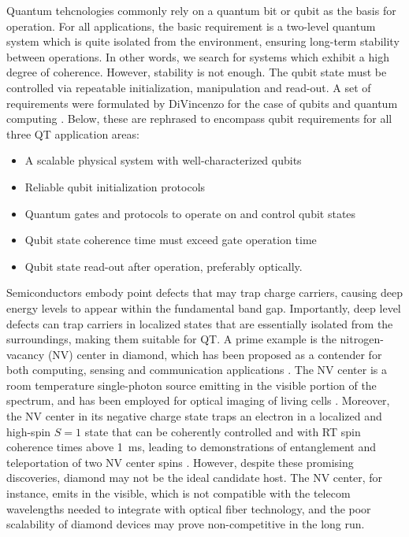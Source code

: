 \documentclass[superscriptaddress,unsortedaddress,
 amsmath,amssymb,
 aps,
]{revtex4-2}
\begin{document}
Quantum tehcnologies commonly rely on a quantum bit or qubit as the basis for operation. 
For all applications, the basic requirement is a two-level quantum system which is quite isolated from the environment, ensuring long-term stability between operations. In other words, we search for systems which exhibit a high degree of coherence. 
However, stability is not enough. The qubit state must be controlled via repeatable initialization, manipulation and read-out. 
A set of requirements were formulated by DiVincenzo for the case of qubits and quantum computing \cite{DiVincenzo2000}. Below, these are rephrased to encompass qubit requirements for all three QT application areas:  
\begin{itemize}
    \item A scalable physical system with well-characterized qubits
    \item Reliable qubit initialization protocols 
    \item Quantum gates and protocols to operate on and control qubit states  
    \item Qubit state coherence time must exceed gate operation time 
    \item Qubit state read-out after operation, preferably optically.  
\end{itemize}

Semiconductors embody point defects that may trap charge carriers, causing deep energy levels to appear within the fundamental band gap. 
Importantly, deep level defects can trap carriers in localized states that are essentially isolated from the surroundings, making them suitable for QT. 
A prime example is the nitrogen-vacancy (NV) center in diamond, which has been proposed 
as a contender for both computing, sensing and communication applications \cite{Doherty_2013}. 
The NV center is a room temperature single-photon source emitting in the visible portion of the spectrum, and has been employed for optical imaging of living cells \cite{Lesage_2013}.  
Moreover, the NV center in its negative charge state traps an electron in a localized and high-spin $S=1$ state that can be coherently controlled and with RT spin coherence times above \SI{1}{\milli\second}, 
leading to demonstrations of entanglement and teleportation of two NV center spins \cite{Bernien2013,Pfaff_2014}. 
However, despite these promising discoveries, diamond may not be the ideal candidate host. The NV center, for instance, emits in the visible, which is not compatible with the telecom wavelengths needed to integrate with optical fiber technology, and the poor scalability of diamond devices may prove non-competitive in the long run. 
\end{document}
